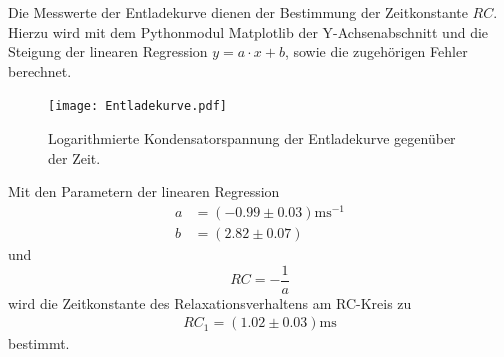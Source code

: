 \noindent Die Messwerte der Entladekurve dienen der Bestimmung der Zeitkonstante $RC$.  
Hierzu wird mit dem Pythonmodul Matplotlib \cite{matplotlib} der Y-Achsenabschnitt und die Steigung der linearen Regression $y = a \cdot x + b$, 
sowie die zugehörigen Fehler berechnet.\\
\begin{figure}[H]
  \centering
  \texttt{[image: Entladekurve.pdf]}
  \caption{Logarithmierte Kondensatorspannung der Entladekurve gegenüber der Zeit.}
  \label{fig:Entladekurve_plot}
\end{figure}
\noindent Mit den Parametern der linearen Regression
\begin{align*}
a &= (-0.99 ± 0.03)\si{\milli\second\tothe{-1}} \\
b &= (2.82 ± 0.07)
\end{align*}
und 
\begin{equation*}
  RC= - \frac{1}{a}
\end{equation*}
wird die Zeitkonstante des Relaxationsverhaltens am RC-Kreis zu
\begin{align*}
  RC_1=(1.02 ± 0.03)\si{\milli\second}
\end{align*}
bestimmt.


